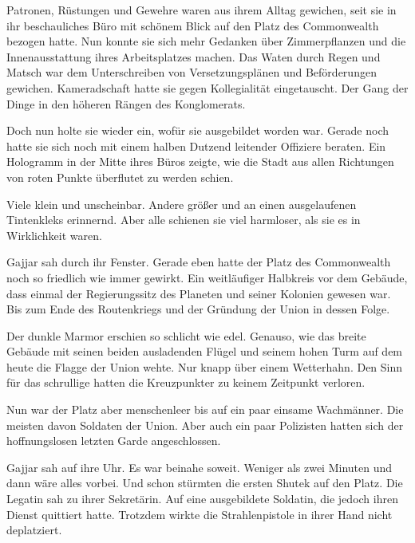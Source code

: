 \par

Patronen, Rüstungen und Gewehre waren aus ihrem Alltag gewichen, seit sie in ihr beschauliches Büro mit schönem Blick auf den Platz des Commonwealth bezogen hatte. Nun konnte sie sich mehr Gedanken über Zimmerpflanzen und die Innenausstattung ihres Arbeitsplatzes machen. Das Waten durch Regen und Matsch war dem Unterschreiben von Versetzungsplänen und Beförderungen gewichen. Kameradschaft hatte sie gegen Kollegialität eingetauscht. Der Gang der Dinge in den höheren Rängen des Konglomerats.

\par

Doch nun holte sie wieder ein, wofür sie ausgebildet worden war. Gerade noch hatte sie sich noch mit einem halben Dutzend leitender Offiziere beraten. Ein Hologramm in der Mitte ihres Büros zeigte, wie die Stadt aus allen Richtungen von roten Punkte überflutet zu werden schien.

\par

Viele klein und unscheinbar. Andere größer und an einen ausgelaufenen Tintenkleks erinnernd. Aber alle schienen sie viel harmloser, als sie es in Wirklichkeit waren.

\par

Gajjar sah durch ihr Fenster. Gerade eben hatte der Platz des Commonwealth noch so friedlich wie immer gewirkt. Ein weitläufiger Halbkreis vor dem Gebäude, dass einmal der Regierungssitz des Planeten und seiner Kolonien gewesen war. Bis zum Ende des Routenkriegs und der Gründung der Union in dessen Folge.

\par

Der dunkle Marmor erschien so schlicht wie edel. Genauso, wie das breite Gebäude mit seinen beiden ausladenden Flügel und seinem hohen Turm auf dem heute die Flagge der Union wehte. Nur knapp über einem Wetterhahn. Den Sinn für das schrullige hatten die Kreuzpunkter zu keinem Zeitpunkt verloren.

\par

Nun war der Platz aber menschenleer bis auf ein paar einsame Wachmänner. Die meisten davon Soldaten der Union. Aber auch ein paar Polizisten hatten sich der hoffnungslosen letzten Garde angeschlossen.

\par

Gajjar sah auf ihre Uhr. Es war beinahe soweit. Weniger als zwei Minuten und dann wäre alles vorbei. Und schon stürmten die ersten Shutek auf den Platz. Die Legatin sah zu ihrer Sekretärin. Auf eine ausgebildete Soldatin, die jedoch ihren Dienst quittiert hatte. Trotzdem wirkte die Strahlenpistole in ihrer Hand nicht deplatziert.

